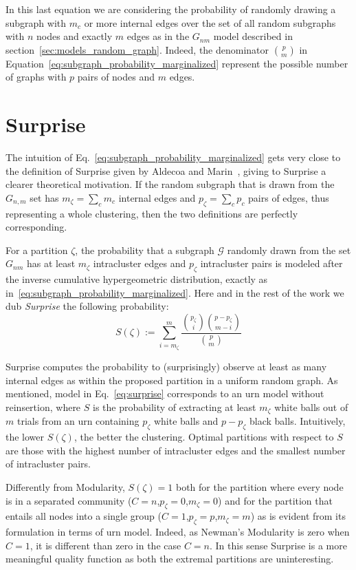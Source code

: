 In this last equation we are considering the probability of randomly drawing a subgraph with $m_c$ or more internal edges over the set of all random subgraphs with $n$ nodes and exactly $m$ edges as in the $G_{nm}$ model described in section~\ref{sec:models_random_graph}. Indeed, the denominator $\binom{p}{m}$ in Equation~\ref{eq:subgraph_probability_marginalized} represent the possible number of graphs with $p$ pairs of nodes and $m$ edges. 

\section{Surprise}
The intuition of Eq.~\ref{eq:subgraph_probability_marginalized} gets very close to the definition of Surprise given by Aldecoa and Marin~\cite{aldecoa2011}, giving to Surprise a clearer theoretical motivation. If the random subgraph that is drawn from the $G_{n,m}$ set has $m_\zeta=\sum_c m_c$ internal edges and $p_\zeta=\sum_c p_c$ pairs of edges, thus representing a whole clustering, then the two definitions are perfectly corresponding.

For a partition $\zeta$, the probability that a subgraph $\mathcal{G}$ randomly drawn from the set $G_{nm}$ has at least $m_\zeta$ intracluster edges and $p_\zeta$ intracluster pairs is modeled after the inverse cumulative hypergeometric distribution, exactly as in~\ref{eq:subgraph_probability_marginalized}.
Here and in the rest of the work we dub \emph{Surprise} the following probability:
\begin{equation}\label{eq:surprise}
S(\zeta) := \sum_{i = m_\zeta}^m \dfrac{\binom{p_\zeta}{i} \binom{p-p_\zeta}{m-i} }{\binom{p}{m}} 
\end{equation}

Surprise computes the probability to (surprisingly) observe at least as many internal edges as within the proposed partition in a uniform random graph.
As mentioned, model in Eq.~\ref{eq:surprise}  corresponds to an urn model without reinsertion, where $S$ is the probability of extracting at least $m_\zeta$ white balls out of $m$ trials from an urn containing $p_\zeta$ white balls and $p-p_\zeta$ black balls.
Intuitively, the lower $S(\zeta)$, the better the clustering. Optimal partitions with respect to $S$ are those with the highest number of intracluster edges and the smallest number of intracluster pairs. 

Differently from Modularity, $S(\zeta)=1$ both for the partition where every node is in a separated community ($C=n$,$p_\zeta=0$,$m_\zeta=0$) and for the partition that entails all nodes into a single group ($C=1$,$p_\zeta=p$,$m_\zeta=m$) as is evident from its formulation in terms of urn model. Indeed, as Newman's Modularity is zero when $C=1$, it is different than zero in the case $C=n$. In this sense Surprise is a more meaningful quality function as both the extremal partitions are uninteresting.

